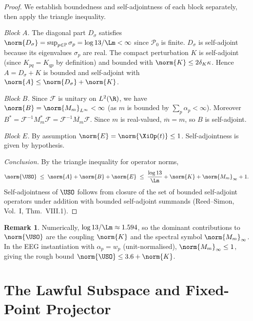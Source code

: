 \documentclass[12pt,a4paper]{article}
\theoremstyle{plain}
\theoremstyle{definition}
\newtheorem{remark}[theorem]{Remark}
\newcommand{\PP}{\mathbb{P}}
\begin{document}
\begin{proof}
  We establish boundedness and self-adjointness of each block separately,
  then apply the triangle inequality.

  \medskip\noindent\textit{Block $A$.}
  The diagonal part $D_\sigma$ satisfies
  $\norm{D_\sigma} = \sup_{p\in\PP}\sigma_p
  = \log 13/\Lm < \infty$
  since $\mathcal{P}_0$ is finite.  $D_\sigma$ is self-adjoint because its
  eigenvalues $\sigma_p$ are real.  The compact perturbation $K$ is
  self-adjoint (since $K_{pq} = K_{qp}$ by definition) and bounded with
  $\norm{K}\le 2\delta_K\kappa$.  Hence $A = D_\sigma + K$ is bounded
  and self-adjoint with $\norm{A}\le \norm{D_\sigma}+\norm{K}$.

  \medskip\noindent\textit{Block $B$.}
  Since $\mathcal{F}$ is unitary on $L^2(\R)$, we have
  $\norm{B} = \norm{M_m}_{L^\infty} < \infty$ (as $m$ is bounded by
  $\sum_p\alpha_p < \infty$).  Moreover $B^* = \mathcal{F}^{-1}M_m^*\mathcal{F}
  = \mathcal{F}^{-1}\overline{M_m}\mathcal{F}$.  Since $m$ is real-valued,
  $\overline{m} = m$, so $B$ is self-adjoint.

  \medskip\noindent\textit{Block $E$.}
  By assumption $\norm{E} = \norm{\XiOp(t)}\le 1$.  Self-adjointness is
  given by hypothesis.

  \medskip\noindent\textit{Conclusion.}
  By the triangle inequality for operator norms,
  \[
    \norm{\USO} \;\le\; \norm{A} + \norm{B} + \norm{E}
    \;\le\; \frac{\log 13}{\Lm} + \norm{K}
             + \norm{M_m}_\infty + 1.
  \]
  Self-adjointness of $\USO$ follows from closure of the set of bounded
  self-adjoint operators under addition with bounded self-adjoint
  summands (Reed--Simon, Vol.~I, Thm.~VIII.1).
\end{proof}

\begin{remark}
  Numerically, $\log 13 / \Lm \approx 1.594$, so the dominant
  contributions to $\norm{\USO}$ are the coupling $\norm{K}$ and the
  spectral symbol $\norm{M_m}_\infty$.  In the EEG instantiation with
  $\alpha_p = w_p$ (unit-normalised), $\norm{M_m}_\infty \le 1$, giving
  the rough bound $\norm{\USO}\le 3.6 + \norm{K}$.
\end{remark}

\section{The Lawful Subspace and Fixed-Point Projector}
\label{sec:lawful}
\end{document}
